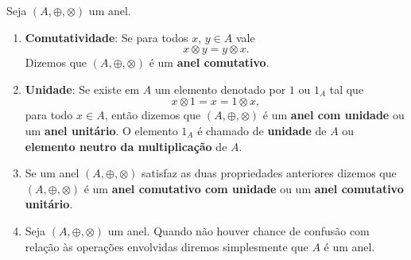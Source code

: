 \begin{observacoes}
	Seja $(A, \oplus, \otimes)$ um anel.
	\begin{enumerate}[label={\arabic*})]
		\item \textbf{Comutatividade}: Se para todos $x$, $y \in A$ vale
		\[
			x \otimes y = y \otimes x.
		\]
		Dizemos que $(A, \oplus, \otimes)$ {\'e} um \textbf{anel comutativo}.

		\item \textbf{Unidade}: Se existe em $A$ um elemento denotado por $1$ ou $1_{A}$ tal que
		\[
			x \otimes 1 = x = 1 \otimes x,
		\]
		para todo $x \in A$, ent{\~a}o dizemos que $(A, \oplus, \otimes)$ \'e um \textbf{anel com unidade} ou um \textbf{anel unit{\'a}rio}. O elemento $1_A$ {\'e} chamado de \textbf{unidade} de $A$ ou \textbf{elemento neutro da multiplica\c{c}\~ao} de $A$.

		\item Se um anel $(A, \oplus, \otimes)$ satisfaz as duas propriedades anteriores dizemos que $(A, \oplus, \otimes)$ \'e um \textbf{anel comutativo com unidade} ou um \textbf{anel comutativo unit\'ario}.

		\item Seja $(A, \oplus, \otimes)$ um anel. Quando n\~ao houver chance de confus\~ao com rela\c{c}\~ao \`as opera\c{c}\~oes envolvidas diremos simplesmente que $A$ \'e um anel.
	\end{enumerate}
\end{observacoes}

